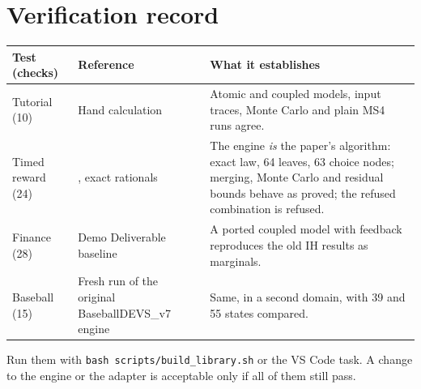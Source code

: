 \documentclass[11pt]{article}
\newcommand{\code}[1]{\texttt{#1}}
\begin{document}
\section{Verification record}
\begin{center}
\small
\begin{tabularx}{\linewidth}{@{}p{3.0cm} p{4.4cm} Y@{}}
\toprule
\textbf{Test (checks)} & \textbf{Reference} & \textbf{What it establishes}\\
\midrule
Tutorial (10) & Hand calculation & Atomic and coupled models, input traces, Monte Carlo and plain MS4 runs agree.\\
Timed reward (24) & , exact rationals & The engine \emph{is} the paper's algorithm:
  exact law, 64 leaves, 63 choice nodes; merging, Monte Carlo and residual bounds behave as proved; the refused
  combination is refused.\\
Finance (28) & Demo Deliverable baseline & A ported coupled model with feedback reproduces the old IH results as marginals.\\
Baseball (15) & Fresh run of the original BaseballDEVS\_v7 engine & Same, in a second domain, with 39 and 55 states compared.\\
\bottomrule
\end{tabularx}
\end{center}
Run them with \code{bash scripts/build\_library.sh} or the VS Code task. A change to the engine or the adapter is
acceptable only if all of them still pass.
\end{document}

